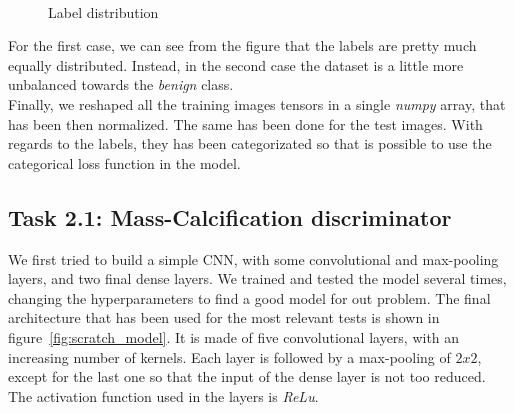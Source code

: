 \documentclass[11pt,a4paper,oneside]{article}
\begin{document}
\begin{figure}[h]
\centering
	 \quad
	 \\
\caption{Label distribution}
\label{fig:label distribution}
\end{figure}

For the first case, we can see from the figure that the labels are pretty much equally distributed. Instead, in the second case the dataset is a little more unbalanced towards the \textit{benign} class. \\
Finally, we reshaped all the training images tensors in a single \textit{numpy} array, that has been then normalized. The same has been done for the test images. With regards to the labels, they has been categorizated so that is possible to use the categorical loss function in the model.

\subsection{Task 2.1: Mass-Calcification discriminator}
We first tried to build a simple CNN, with some convolutional and max-pooling layers, and two final dense layers. We trained and tested the model several times, changing the hyperparameters to find a good model for out problem. The final architecture that has been used for the most relevant tests is shown in figure~\ref{fig:scratch_model}. It is made of five convolutional layers, with an increasing number of kernels. Each layer is followed by a max-pooling of $2x2$, except for the last one so that the input of the dense layer is not too reduced. The activation function used in the layers is \textit{ReLu}.
\end{document}

